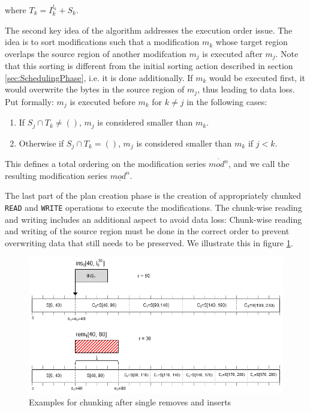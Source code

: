 \documentclass[english, 10pt, openright, twocolumn, landscape, twoside, notitlepage, a4paper, pdftex]		
{article}
\begin{document}
where $T_{k}=I_{k}^{l_{k}}+S_{k}$.

The second key idea of the algorithm addresses the execution order issue. The idea is to sort modifications such that a modification $m_{k}$ whose target region overlaps the source region of another modifcation $m_{j}$ is executed after $m_{j}$. Note that this sorting is different from the initial sorting action described in section \ref{sec:SchedulingPhase}, i.e. it is done additionally. If $m_{k}$ would be executed first, it would overwrite the bytes in the source region of $m_{j}$, thus leading to data loss. Put formally: $m_{j}$ is executed before $m_{k}$ for $k\neq j$ in the following cases:
\begin{enumerate}
\item If $S_{j}\cap T_{k}\neq ()$, $m_{j}$ is considered smaller than $m_{k}$.
\item Otherwise if $S_{j}\cap T_{k}=()$, $m_{j}$ is considered smaller than $m_{k}$ if $j<k$.
\end{enumerate}

This defines a total ordering on the modification series $\overline{mod^{n}}$, and we call the resulting modification series $\underline{mod^{n}}$.

The last part of the plan creation phase is the creation of appropriately chunked \texttt{READ} and \texttt{WRITE} operations to execute the modifications. The chunk-wise reading and writing includes an additional aspect to avoid data loss: Chunk-wise reading and writing of the source region must be done in the correct order to prevent overwriting data that still needs to be preserved. We illustrate this in figure \ref{fig:ChunkOrder}.

\begin{figure}[htbp]
\centering
\includegraphics[width=1.00\columnwidth]{figures/Chunks.png}
\caption{Examples for chunking after single removes and inserts}
\label{fig:ChunkOrder}
\end{figure}
\end{document}
